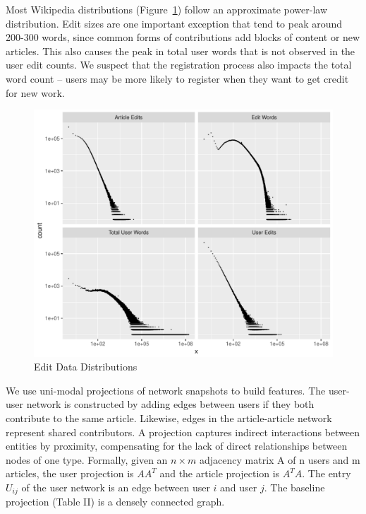 \documentclass[letterpaper, 12pt, conference]{ieeeconf}
\begin{document}
Most Wikipedia distributions (Figure~\ref{fig:distributions}) follow an approximate power-law distribution. Edit sizes are one important exception that tend to peak around 200-300 words, since common forms of contributions add blocks of content or new articles. This also causes the peak in total user words that is not observed in the user edit counts. We suspect that the registration process also impacts the total word count -- users may be more likely to register when they want to get credit for new work.

\begin{figure}[ht]
    \centering
    \includegraphics[width=1\linewidth]{dist_segment.pdf}
    \caption{Edit Data Distributions}
    \label{fig:distributions}
\end{figure}

We use uni-modal projections of network snapshots to build features. The user-user network is constructed by adding edges between users if they both contribute to the same article. Likewise, edges in the article-article network represent shared contributors. A projection captures indirect interactions between entities by proximity, compensating for the lack of direct relationships between nodes of one type. Formally, given an $n \times m$ adjacency matrix A of n users and m articles, the user projection is $AA^T$ and the article projection is $A^TA$. The entry $U_{ij}$ of the user network is an edge between user $i$ and user $j$. The baseline projection (Table II) is a densely connected graph.
\end{document}
